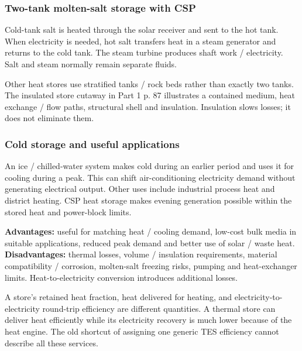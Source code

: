 \documentclass[11pt,a4paper]{article}
\newenvironment{Caution}[1]{\begin{tcolorbox}[colback=warm,colframe=rust,coltitle=white,title={#1}]}{\end{tcolorbox}}
\begin{document}
\subsubsection{Two-tank molten-salt storage with CSP}
Cold-tank salt is heated through the solar receiver and sent to the hot tank. When electricity is needed, hot salt transfers heat in a steam generator and returns to the cold tank. The steam turbine produces shaft work / electricity. Salt and steam normally remain separate fluids.
\begin{center}
\end{center}
Other heat stores use stratified tanks / rock beds rather than exactly two tanks. The insulated store cutaway in Part 1 p. 87 illustrates a contained medium, heat exchange / flow paths, structural shell and insulation. Insulation slows losses; it does not eliminate them.

\subsubsection{Cold storage and useful applications}
An ice / chilled-water system makes cold during an earlier period and uses it for cooling during a peak. This can shift air-conditioning electricity demand without generating electrical output. Other uses include industrial process heat and district heating. CSP heat storage makes evening generation possible within the stored heat and power-block limits.

\textbf{Advantages:} useful for matching heat / cooling demand, low-cost bulk media in suitable applications, reduced peak demand and better use of solar / waste heat. \textbf{Disadvantages:} thermal losses, volume / insulation requirements, material compatibility / corrosion, molten-salt freezing risks, pumping and heat-exchanger limits. Heat-to-electricity conversion introduces additional losses.

\begin{Caution}{Thermal efficiency is not one universal percentage}
A store's retained heat fraction, heat delivered for heating, and electricity-to-electricity round-trip efficiency are different quantities. A thermal store can deliver heat efficiently while its electricity recovery is much lower because of the heat engine. The old shortcut of assigning one generic TES efficiency cannot describe all these services.
\end{Caution}
\end{document}
